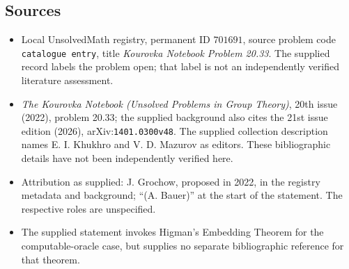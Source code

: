 \documentclass[11pt]{article}
\begin{document}
\subsection{Sources}
\begin{itemize}
\item Local UnsolvedMath registry, permanent ID \(701691\), source problem code \texttt{catalogue entry}, title \emph{Kourovka Notebook Problem 20.33}. The supplied record labels the problem open; that label is not an independently verified literature assessment.
\item \emph{The Kourovka Notebook (Unsolved Problems in Group Theory)}, 20th issue (2022), problem 20.33; the supplied background also cites the 21st issue edition (2026), arXiv:\texttt{1401.0300v48}. The supplied collection description names E. I. Khukhro and V. D. Mazurov as editors. These bibliographic details have not been independently verified here.
\item Attribution as supplied: J. Grochow, proposed in 2022, in the registry metadata and background; ``(A. Bauer)'' at the start of the statement. The respective roles are unspecified.
\item The supplied statement invokes Higman's Embedding Theorem for the computable-oracle case, but supplies no separate bibliographic reference for that theorem.
\end{itemize}
\end{document}
